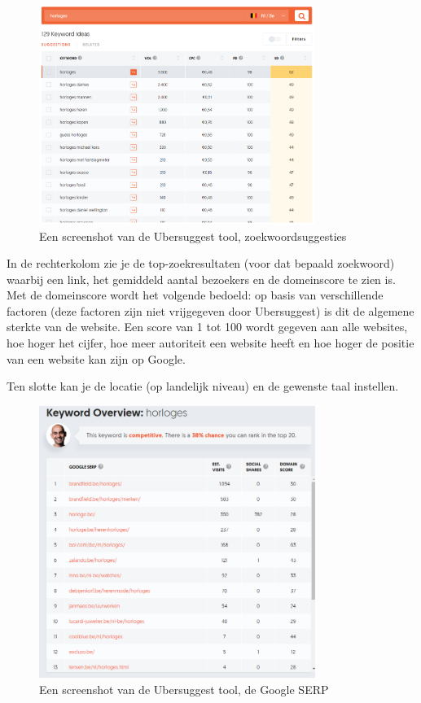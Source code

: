 \begin{figure}[h!]
\centering
\includegraphics[width=0.8\textwidth]{img/ubers.PNG}
\caption{Een screenshot van de Ubersuggest tool, zoekwoordsuggesties \autocite{ubersuggest}}
\end{figure}

In de rechterkolom zie je de top-zoekresultaten (voor dat bepaald zoekwoord) waarbij een link, het gemiddeld aantal bezoekers en de domeinscore te zien is. Met de domeinscore wordt het volgende bedoeld: op basis van verschillende factoren (deze factoren zijn niet vrijgegeven door Ubersuggest) is dit de algemene sterkte van de website. Een score van 1 tot 100 wordt gegeven aan alle websites, hoe hoger het cijfer, hoe meer autoriteit een website heeft en hoe hoger de positie van een website kan zijn op Google. 

Ten slotte kan je de locatie (op landelijk niveau) en de gewenste taal instellen. 

\begin{figure}[h!]
\centering
\includegraphics[width=0.8\textwidth]{img/ubersrechts.PNG}
\caption{Een screenshot van de Ubersuggest tool, de Google SERP}
\end{figure}

